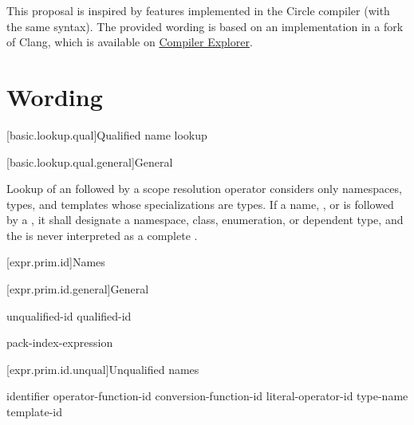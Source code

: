 \documentclass{wg21}
\begin{document}
This proposal is inspired by features implemented in the Circle compiler (with the same syntax).
The provided wording is based on an implementation in a fork of Clang, which is available on \href{https://compiler-explorer.com/z/WKobTEq6x}{Compiler Explorer}.

\section{Wording}

[basic.lookup.qual]{Qualified name lookup}

[basic.lookup.qual.general]{General}

\pnum
{}%
%
%
Lookup of an 
followed by a \tcode{::} scope resolution operator
considers only
namespaces, types, and templates whose specializations are types.
If a name, , or 
is followed by a \tcode{::},
it shall designate a namespace, class, enumeration, or dependent type,
and the \tcode{::} is never interpreted as
a complete .


[expr.prim.id]{Names}

[expr.prim.id.general]{General}

\begin{bnf}
	\br
	unqualified-id\br
	qualified-id\br
\begin{addedblock}
	pack-index-expression
\end{addedblock}
\end{bnf}

[expr.prim.id.unqual]{Unqualified names}





\begin{bnf}
    \br
    identifier\br
    operator-function-id\br
    conversion-function-id\br
    literal-operator-id\br
    \terminal{\~} type-name\br
    \terminal{\~} \br
    template-id
\end{bnf}
\end{document}
